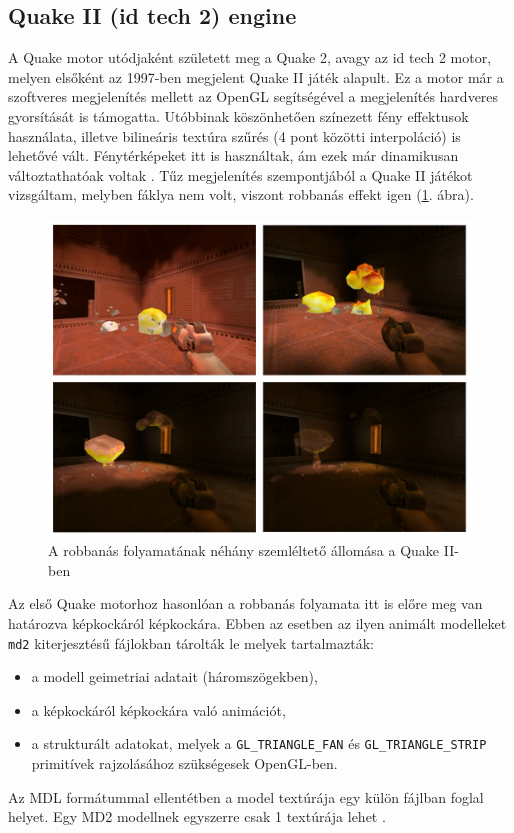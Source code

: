 \subsection{Quake II (id tech 2) engine}


A Quake motor utódjaként született meg a Quake 2, avagy az id tech 2 motor, melyen elsőként az 1997-ben megjelent Quake II játék alapult. Ez a motor már a szoftveres megjelenítés mellett az OpenGL segítségével a megjelenítés hardveres gyorsítását is támogatta. Utóbbinak köszönhetően színezett fény effektusok használata, illetve bilineáris textúra szűrés (4 pont közötti interpoláció) is lehetővé vált. Fénytérképeket itt is használtak, ám ezek már dinamikusan változtathatóak voltak \cite{wikiQuake2, fsQuake2}. Tűz megjelenítés szempontjából a Quake II játékot vizsgáltam, melyben fáklya nem volt, viszont robbanás effekt igen (\ref{fig:quake2explosion}. ábra).

\begin{figure}[h]
\centering
\includegraphics[width=\textwidth]{kepek/quake2explosion9.png}
\caption{A robbanás folyamatának néhány szemléltető állomása a Quake II-ben}
\label{fig:quake2explosion}
\end{figure}

Az első Quake motorhoz hasonlóan a robbanás folyamata itt is előre meg van határozva képkockáról képkockára. Ebben az esetben az ilyen animált modelleket \texttt{md2} kiterjesztésű fájlokban tárolták le melyek tartalmazták:
\begin{itemize} 
\item a modell geimetriai adatait (háromszögekben),
\item a képkockáról képkockára való animációt,
\item a strukturált adatokat, melyek a \texttt{GL\_TRIANGLE\_FAN} és \texttt{GL\_TRIANGLE\_STRIP} primitívek rajzolásához szükségesek OpenGL-ben.
\end{itemize} 
Az MDL formátummal ellentétben a model textúrája egy külön fájlban foglal helyet. Egy MD2 modellnek egyszerre csak 1 textúrája lehet \cite{MD2format}.

